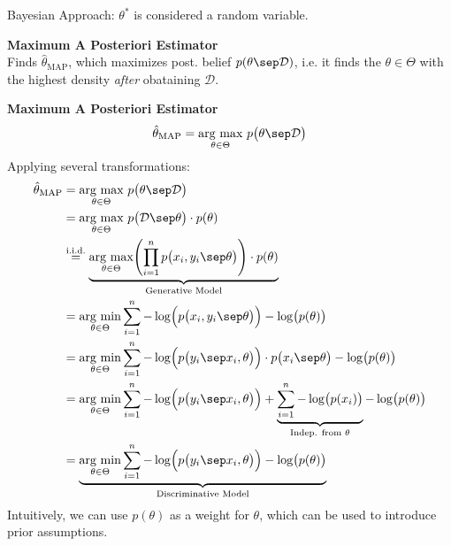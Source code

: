 Bayesian Approach: $\theta^*$ is considered a random variable.

\method \textbf{Maximum A Posteriori Estimator}\\
Finds $\hat{\theta}_\text{MAP}$, which maximizes post. belief $p(\theta\sep\mathcal{D})$, i.e. it finds the $\theta \in \Theta$ with the highest density \textit{after} obataining $\mathcal{D}$.

 \textbf{Maximum A Posteriori Estimator}\\
$$
\hat{\theta}_\text{MAP} = \underset{\theta \in \Theta}{\text{arg max}}\ p\bigl( \theta\sep\mathcal{D} \bigr)
$$
Applying several transformations:
{\footnotesize
\begin{align*}
    \hat{\theta}_\text{MAP}     &= \underset{\theta \in \Theta}{\text{arg max}}\ p\bigl( \theta\sep\mathcal{D} \bigr)                                                                                                               \\
                                &= \underset{\theta \in \Theta}{\text{arg max}}\ p\bigl( \mathcal{D}\sep\theta \bigr)\cdot p(\theta)                                                                                                \\
                                &\overset{\text{i.i.d.}}{=} \underbrace{\underset{\theta \in \Theta}{\text{arg max}}\Biggl( \prod_{i=1}^n p\bigl( x_i,y_i \sep \theta \bigr) \Biggr)\cdot p(\theta)}_\text{Generative Model}        \\ 
                                &= \underset{\theta\in\Theta}{\text{arg min}} \sum_{i=1}^n -\log\Bigl( p\bigl( x_i,y_i \sep \theta \bigr) \Bigr) - \log\bigl( p(\theta) \bigr)                                                      \\
                                &= \underset{\theta\in\Theta}{\text{arg min}} \sum_{i=1}^n -\log\Bigl( p\bigl( y_i \sep x_i , \theta \bigr) \Bigr)\cdot p\bigl( x_i \sep \theta \bigr) - \log\bigl( p(\theta) \bigr)                \\
                                &= \underset{\theta\in\Theta}{\text{arg min}} \sum_{i=1}^n -\log\Bigl( p\bigl( y_i \sep x_i , \theta \bigr) \Bigr) + \underbrace{\sum_{i=1}^n -\log\bigl( p(x_i) \bigr)}_\text{Indep. from $\theta$} - \log\bigl( p(\theta) \bigr)           \\
                                &= \underbrace{\underset{\theta\in\Theta}{\text{arg min}} \sum_{i=1}^n -\log\Bigl( p\bigl( y_i \sep x_i , \theta \bigr) \Bigr) - \log\bigl( p(\theta) \bigr)}_\text{Discriminative Model}
\end{align*}
}
{\footnotesize
    \remark Intuitively, we can use $p(\theta)$ as a weight for $\theta$, which can be used to introduce prior assumptions.
}

